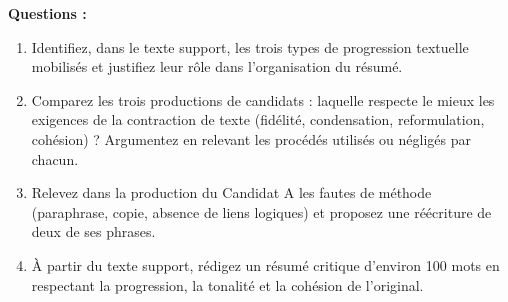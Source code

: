 \documentclass[11pt]{article}
\begin{document}
\begin{exercice}
\vspace{6pt}
\noindent\textbf{Questions :}
\begin{enumerate}
  \item Identifiez, dans le texte support, les trois types de progression textuelle mobilisés et justifiez leur rôle dans l'organisation du résumé.
  \item Comparez les trois productions de candidats : laquelle respecte le mieux les exigences de la contraction de texte (fidélité, condensation, reformulation, cohésion) ? Argumentez en relevant les procédés utilisés ou négligés par chacun.
  \item Relevez dans la production du Candidat A les fautes de méthode (paraphrase, copie, absence de liens logiques) et proposez une réécriture de deux de ses phrases.
  \item À partir du texte support, rédigez un résumé critique d'environ 100 mots en respectant la progression, la tonalité et la cohésion de l'original.
\end{enumerate}
\end{exercice}
\end{document}
